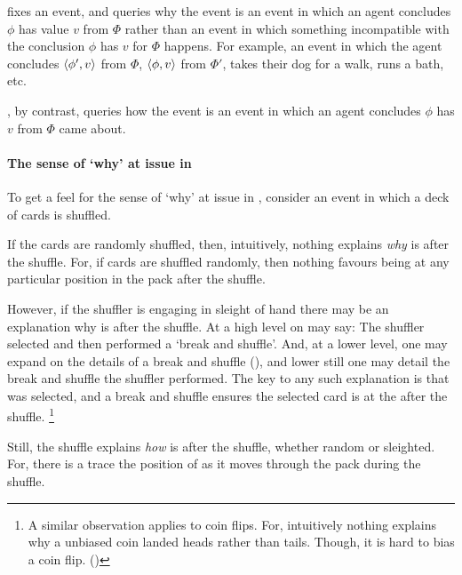 \begin{note}
  \qWhy{} fixes an event, and queries why the event is an event in which an agent concludes \(\phi\) has value \(v\) from \(\Phi\) rather than an event in which something incompatible with the conclusion \(\phi\) has  \(v\) for \(\Phi\) happens.
  For example, an event in which the agent concludes \(\langle \phi', v \rangle\) from \(\Phi\), \(\langle \phi, v \rangle\) from \(\Phi'\), takes their dog for a walk, runs a bath, etc.

  \qHow{}, by contrast, queries how the event is an event in which an agent concludes \(\phi\) has  \(v\) from \(\Phi\) came about.
\end{note}


\paragraph*{The sense of `why' at issue in \qWhy{}}


\begin{note}
  To get a feel for the sense of `why' at issue in \qWhy{}, consider an event in which a deck of cards is shuffled.

  If the cards are randomly shuffled, then, intuitively, nothing explains \emph{why} \mainCard{} is \mainCardPos{} after the shuffle.
  For, if cards are shuffled randomly, then nothing favours \mainCard{} being at any particular position in the pack after the shuffle.

  However, if the shuffler is engaging in sleight of hand there may be an explanation why \mainCard{} is \mainCardPos{} after the shuffle.
  At a high level on may say: The shuffler selected \mainCard{} and then performed a `break and shuffle'.
  And, at a lower level, one may expand on the details of a break and shuffle (\cite[cf.][189--190]{Hilliard:1994aa}), and lower still one may detail the break and shuffle the shuffler performed.
  The key to any such explanation is that \mainCard{} was selected, and a break and shuffle ensures the selected card is at the \mainCardPos{} after the shuffle.%
  \footnote{
    A similar observation applies to coin flips.
    For, intuitively nothing explains why a unbiased coin landed heads rather than tails.
    Though, it is hard to bias a coin flip. (\cite{Gelman:2002ww})
  }
\end{note}

\begin{note}
  Still, the shuffle explains \emph{how} \mainCard{} is \mainCardPos{} after the shuffle, whether random or sleighted.
  For, there is a trace the position of \mainCard{} as it moves through the pack during the shuffle.
\end{note}



